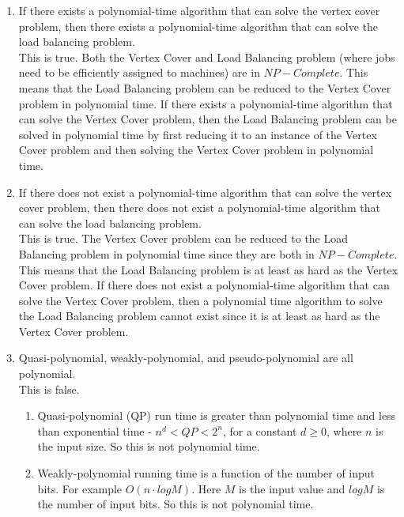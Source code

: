 \documentclass[paper=a4, fontsize=11pt]{scrartcl} %
\numberwithin{figure}{section} %
\numberwithin{table}{section} %
\begin{document}
\begin{enumerate}
\begin{enumerate}
\item If there exists a polynomial-time algorithm that can solve the vertex cover problem, then there exists a polynomial-time algorithm that can solve the load balancing problem.\\

This is true. Both the Vertex Cover and Load Balancing problem (where jobs need to be efficiently assigned to machines) are in $NP-Complete$. This means that the Load Balancing problem can be reduced to the Vertex Cover problem in polynomial time.  If there exists a polynomial-time algorithm that can solve the Vertex Cover problem, then the Load Balancing problem can be solved in polynomial time by first reducing it to an instance of the Vertex Cover problem and then solving the Vertex Cover problem in polynomial time.

\item If there does not exist a polynomial-time algorithm that can solve the vertex cover problem, then there does not exist a polynomial-time algorithm that can solve the load balancing problem.\\

This is true. The Vertex Cover problem can be reduced to the Load Balancing problem in polynomial time since they are both in $NP-Complete$. This means that the Load Balancing problem is at least as hard as the Vertex Cover problem. If there does not exist a polynomial-time algorithm that can solve the Vertex Cover problem, then a polynomial time algorithm to solve the Load Balancing problem cannot exist since it is at least as hard as the Vertex Cover problem.

\item Quasi-polynomial, weakly-polynomial, and pseudo-polynomial are all polynomial.\\

This is false.

\begin{enumerate}

\item Quasi-polynomial (QP) run time is greater than polynomial time and less than exponential time - $n^d < QP < 2^n$, for a constant $d \geq 0$, where $n$ is the input size. So this is not polynomial time.

\item Weakly-polynomial running time is a function of the number of input bits. For example $O(n \cdot log M)$. Here $M$ is the input value and $log M$ is the number of input bits. So this is not polynomial time.


\end{enumerate}
\end{enumerate}
\end{enumerate}
\end{document}
